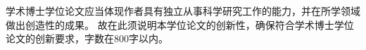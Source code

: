 
\begin{innovations}

学术博士学位论文应当体现作者具有独立从事科学研究工作的能力，并在所学领域做出创造性的成果。
故在此须说明本学位论文的创新性，确保符合学术博士学位论文的创新要求，字数在800字以内。

\end{innovations}


%
%
%
